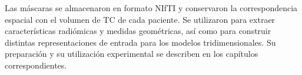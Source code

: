 Las máscaras se almacenaron en formato NIfTI y conservaron la correspondencia espacial con el volumen de TC de cada paciente. Se utilizaron para extraer características radiómicas y medidas geométricas, así como para construir distintas representaciones de entrada para los modelos tridimensionales. Su preparación y su utilización experimental se describen en los capítulos correspondientes.








